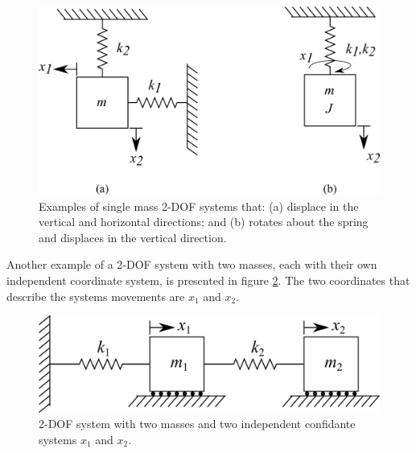 \documentclass[12pt,letter]{article}
\numberwithin{ex}{section} %
\numberwithin{re}{section} %
\begin{document}
\begin{figure}[H]
	\centering
	\includegraphics[]{../Figures/2-DOF-spring_mass_examples.png}
	\caption{Examples of single mass 2-DOF systems that: (a) displace in the vertical and horizontal directions; and (b) rotates about the spring and displaces in the vertical direction. }
	\label{fig:2-DOF-spring_mass_examples}
\end{figure}

Another example of a 2-DOF system with two masses, each with their own independent coordinate system, is presented in figure \ref{fig:2-DOF-spring_mass_horizontal}. The two coordinates that describe the systems movements are $x_1$ and $x_2$.

\begin{figure}[H]
	\centering
	\includegraphics[]{../Figures/2-DOF-spring_mass_horizontal.png}
	\caption{2-DOF system with two masses and two independent confidante systems $x_1$ and $x_2$.}
	\label{fig:2-DOF-spring_mass_horizontal}
\end{figure}
\end{document}
